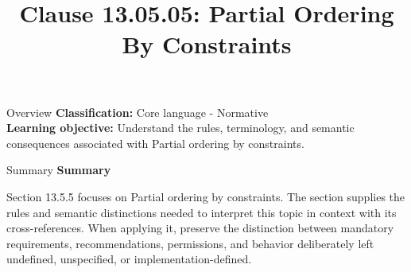 \documentclass[10pt,letterpaper]{article}
\title{Clause 13.05.05: Partial Ordering By Constraints}
\author{}
\date{}
\begin{document}
\maketitle
\begin{CornellOverviewBox}{Overview}
\textbf{Classification:} Core language - Normative\\[2pt]
\textbf{Learning objective:} Understand the rules, terminology, and semantic consequences associated with Partial ordering by constraints.
\end{CornellOverviewBox}\begin{CornellSummaryBox}{Summary}
{\sffamily\bfseries\color{Accent} Summary}\par\vspace{3pt}Section 13.5.5 focuses on Partial ordering by constraints. The section supplies the rules and semantic distinctions needed to interpret this topic in context with its cross-references. When applying it, preserve the distinction between mandatory requirements, recommendations, permissions, and behavior deliberately left undefined, unspecified, or implementation-defined.
\end{CornellSummaryBox}
\end{document}
